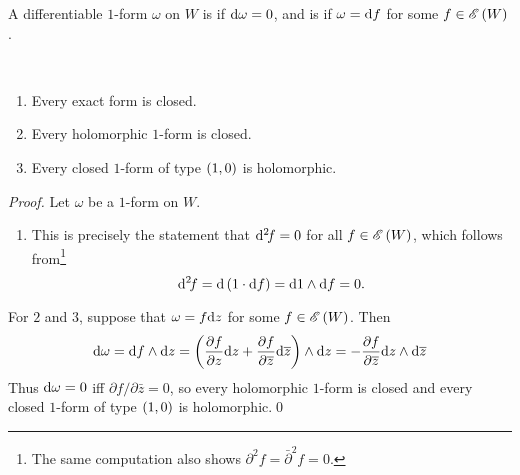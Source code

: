 \documentclass[../Moduli_Spaces_of_Riemann_Surfaces.tex]{subfiles}
\begin{document}
    \begin{definition}
        A differentiable $1$-form $\omega$ on $W$ is  if $\mathrm{d}\omega=0$, and is  if $\omega=\mathrm{d} f$ for some $f\in\mathscr{E}\left(W\right)$.
    \end{definition}
    \begin{proposition}\ 
        \begin{enumerate}
            \item Every exact form is closed.
                \vspace{-0.05in}
            \item Every holomorphic $1$-form is closed.
                \vspace{-0.05in}
            \item Every closed $1$-form of type $\left(1,0\right)$ is holomorphic.
        \end{enumerate}
    \end{proposition}
    \begin{proof}
        Let $\omega$ be a $1$-form on $W$.
        \begin{enumerate}
            \item This is precisely the statement that $\mathrm{d}^2\!f=0$ for all $f\in\mathscr{E}\left(W\right)$, which follows from\footnote{The same computation also shows $\partial^2\!f=\bar{\partial}^2\!f=0$.}
                \begin{equation*}
                    \mathrm{d}^2\!f=\mathrm{d}\left(1\cdot\mathrm{d} f\right)=\mathrm{d}1\wedge\mathrm{d} f=0.
                \end{equation*}
        \end{enumerate}
        \vspace{-0.05in}
        For $2$ and $3$, suppose that $\omega=f\mathrm{d} z$ for some $f\in\mathscr{E}\left(W\right)$. Then
        \begin{equation*}
            \mathrm{d}\omega=\mathrm{d} f\wedge\mathrm{d} z=\left(\frac{\partial f}{\partial z}\mathrm{d} z+\frac{\partial f}{\partial\overline{z}}\mathrm{d}\overline{z}\right)\wedge\mathrm{d} z=-\frac{\partial f}{\partial\overline{z}}\mathrm{d} z\wedge\mathrm{d}\overline{z}
        \end{equation*}
        Thus $\mathrm{d}\omega=0$ iff $\partial f/\partial\bar{z}=0$, so every holomorphic $1$-form is closed and every closed $1$-form of type $\left(1,0\right)$ is holomorphic.\qed
    \end{proof}
\end{document}
